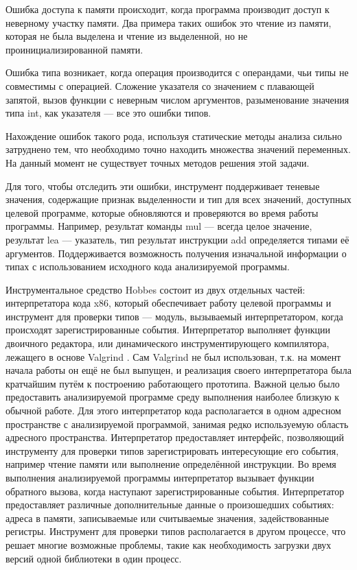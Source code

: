 \documentclass[a4paper,12pt,russian]{article}
\newcommand{\code}[1]{\textsf{#1}}
\begin{document}
Ошибка доступа к памяти происходит, когда программа производит доступ к неверному участку памяти.
Два примера таких ошибок это чтение из памяти, которая не была выделена и чтение из выделенной, но не проинициализированной памяти.

Ошибка типа возникает, когда операция производится с операндами, чьи типы не совместимы с операцией.
Сложение указателя со значением с плавающей запятой, вызов функции с неверным числом аргументов, разыменование значения типа \code{int}, как указателя --- все это ошибки типов.

Нахождение ошибок такого рода, используя статические методы анализа сильно затруднено тем, что необходимо точно находить множества значений переменных.
На данный момент не существует точных методов решения этой задачи.

Для того, чтобы отследить эти ошибки, инструмент поддерживает теневые значения, содержащие признак выделенности и тип для всех значений, доступных целевой программе, которые обновляются и проверяются во время работы программы.
Например, результат команды \code{mul} --- всегда целое значение, результат \code{lea} --- указатель, тип результат инструкции \code{add} определяется типами её аргументов.
Поддерживается возможность получения изначальной информации о типах с использованием исходного кода анализируемой программы.

Инструментальное средство \code{Hobbes} состоит из двух отдельных частей: интерпретатора кода \code{x86}, который обеспечивает работу целевой программы и инструмент для проверки типов --- модуль, вызываемый интерпретатором, когда происходят зарегистрированные события.
Интерпретатор выполняет функции двоичного редактора, или динамического инструментирующего компилятора, лежащего в основе \code{Valgrind} \cite{valgrind}. Сам \code{Valgrind} не был использован, т.к. на момент начала работы он ещё не был выпущен, и реализация своего интерпретатора была кратчайшим путём к построению работающего прототипа.
Важной целью было предоставить анализируемой программе среду выполнения наиболее близкую к обычной работе.
Для этого интерпретатор кода располагается в одном адресном пространстве с анализируемой программой, занимая редко используемую область адресного пространства.
Интерпретатор предоставляет интерфейс, позволяющий инструменту для проверки типов зарегистрировать интересующие его события, например чтение памяти или выполнение определённой инструкции.
Во время выполнения анализируемой программы интерпретатор вызывает функции обратного вызова, когда наступают зарегистрированные события.
Интерпретатор предоставляет различные дополнительные данные о произошедших событиях: адреса в памяти, записываемые или считываемые значения, задействованные регистры.
Инструмент для проверки типов располагается в другом процессе, что решает многие возможные проблемы, такие как необходимость загрузки двух версий одной библиотеки в один процесс.
\end{document}
